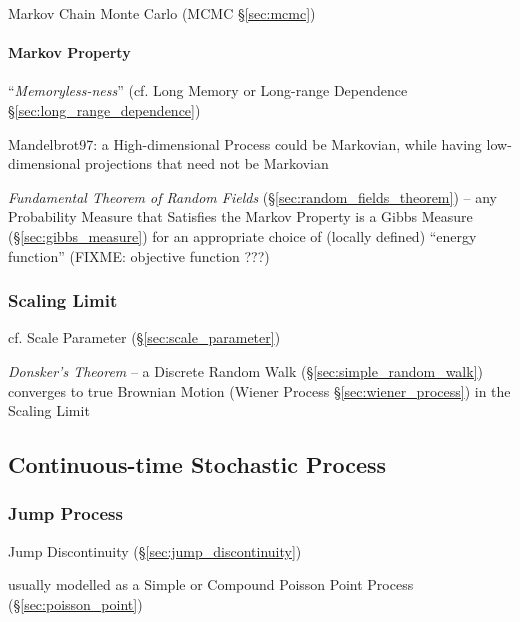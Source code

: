 Markov Chain Monte Carlo (MCMC \S\ref{sec:mcmc})



\paragraph{Markov Property}\label{sec:markov_property}\hfill

``\emph{Memoryless-ness}'' (cf. Long Memory or Long-range Dependence
\S\ref{sec:long_range_dependence})

Mandelbrot97: a High-dimensional Process could be Markovian, while having
low-dimensional projections that need not be Markovian

\emph{Fundamental Theorem of Random Fields} (\S\ref{sec:random_fields_theorem})
-- any Probability Measure that Satisfies the Markov Property is a Gibbs Measure
(\S\ref{sec:gibbs_measure}) for an appropriate choice of (locally defined)
``energy function'' (FIXME: objective function ???)



\subsubsection{Scaling Limit}\label{sec:scaling_limit}

cf. Scale Parameter (\S\ref{sec:scale_parameter})

\emph{Donsker's Theorem} -- a Discrete Random Walk
(\S\ref{sec:simple_random_walk}) converges to true Brownian Motion (Wiener
Process \S\ref{sec:wiener_process}) in the Scaling Limit



\subsection{Continuous-time Stochastic Process}\label{sec:continuous_stochastic}

\subsubsection{Jump Process}\label{sec:jump_process}

\fist Jump Discontinuity (\S\ref{sec:jump_discontinuity})

usually modelled as a Simple or Compound Poisson Point Process
(\S\ref{sec:poisson_point})

